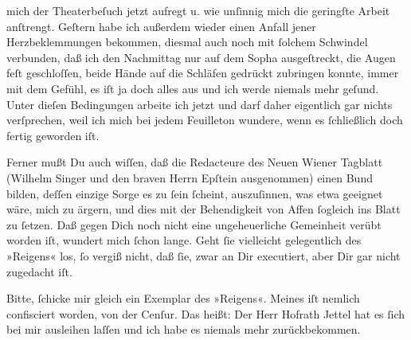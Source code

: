                mich der Theaterbeſuch jetzt aufregt u. wie unſinnig mich die geringſte Arbeit {\pb}anſtrengt. Geſtern habe ich außerdem wieder einen
               Anfall jener Herzbeklemmungen bekommen, diesmal auch noch mit{ }ſolchem Schwindel
               verbunden, daß ich den Nachmittag nur auf dem Sopha ausgeſtreckt, die Augen feſt
               geschloſſen, beide Hände auf die Schläfen gedrückt zubringen konnte, immer mit dem
               Gefühl, es iſt ja doch alles aus und ich werde niemals mehr geſund. Unter dieſen
               Bedingungen arbeite ich jetzt und darf daher eigentlich gar nichts verſprechen, weil
               ich mich bei jedem Feuilleton wundere, wenn es{ }ſchließlich doch fertig geworden
               iſt.\pend
           
\pstart
           Ferner mußt Du auch wiſſen, daß die Redacteure des {\pb}Neuen Wiener Tagblatt (Wilhelm Singer und den braven Herrn Epſtein ausgenommen) einen Bund bilden, deſſen einzige Sorge es
               zu{ }ſein{ }ſcheint, auszuſinnen, was etwa geeignet wäre, mich zu ärgern, und dies mit
               der Behendigkeit von Affen{ }ſogleich ins Blatt zu{ }ſetzen. Daß gegen Dich noch nicht
               eine ungeheuerliche Gemeinheit verübt worden iſt, wundert mich{ }ſchon lange. Geht{ }ſie
               vielleicht gelegentlich des »Reigens« los,{ }ſo
               vergiß nicht, daß{ }ſie, zwar an Dir executiert, aber Dir gar nicht zugedacht iſt.\pend
           
\pstart
           Bitte,{ }ſchicke mir gleich ein Exemplar des »Reigens«. Meines iſt nemlich confisciert {\pb}worden, von der Cenſur. Das heißt: Der Herr Hofrath Jettel hat es{ }ſich bei mir ausleihen laſſen und ich habe es
               niemals mehr zurückbekommen.\pend
           
